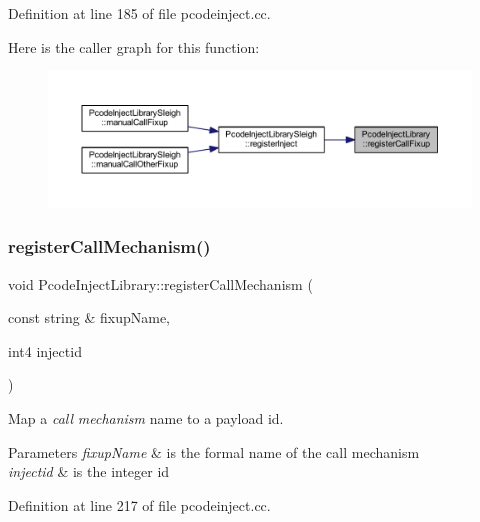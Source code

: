 Definition at line 185 of file pcodeinject.\+cc.

Here is the caller graph for this function\+:
\nopagebreak
\begin{figure}[H]
\begin{center}
\leavevmode
\includegraphics[width=350pt]{class_pcode_inject_library_a2c6c5deb054a7ab6f8e59653ce9d984f_icgraph}
\end{center}
\end{figure}
\mbox{\label{class_pcode_inject_library_a8e767c1d87d0cfabac0341c35c188b88}} 
\subsubsection{\texorpdfstring{registerCallMechanism()}{registerCallMechanism()}}
{\footnotesize\ttfamily void Pcode\+Inject\+Library\+::register\+Call\+Mechanism (\begin{DoxyParamCaption}\item[{const string \&}]{fixup\+Name,  }\item[{int4}]{injectid }\end{DoxyParamCaption})\hspace{0.3cm}{\ttfamily [protected]}}



Map a {\itshape call} {\itshape mechanism} name to a payload id. 


\begin{DoxyParams}{Parameters}
{\em fixup\+Name} & is the formal name of the call mechanism \\
\hline
{\em injectid} & is the integer id \\
\hline
\end{DoxyParams}


Definition at line 217 of file pcodeinject.\+cc.

